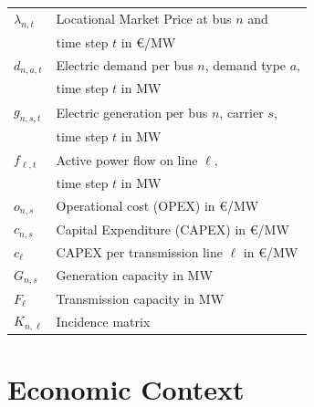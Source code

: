 \documentclass[11pt,twocolumn]{article}
\newcommand{\vpad}{\vspace{1mm}}
\newcommand{\generation}[1][n]{g_{#1,s,t}}
\newcommand{\capacityGeneration}{G_{n,s}}
\newcommand{\capacityFlow}{F_{\ell}}
\newcommand{\capexGeneration}{c_{n,s}}
\newcommand{\capexFlow}{c_{\ell}}
\newcommand{\opexGeneration}[1][n]{o_{#1,s}}
\newcommand{\demand}[1][n]{d_{#1,a,t}}
\newcommand{\incidence}[1][n]{K_{#1,\ell}}
\newcommand{\lmp}[1][n]{\lambda_{#1,t}}
\newcommand{\flow}{f_{\ell,t}}
\begin{document}
\begin{table}[h]
	\centering
	\begin{tabular}{ll}
        $\lmp$ & Locational Market Price at bus $n$ and  \\ & time step $t$ in \euro/MW \vpad \\
        $\demand$ & Electric demand per bus $n$, demand type $a$, \\ & time step $t$ in MW  \vpad \\
        $\generation$ & Electric generation per bus $n$, carrier $s$, \\ & time step $t$  in MW \vpad \\
        $\flow$ & Active power flow on line $\ell$, \\ & time step $t$ in MW   \vpad \\
        $\opexGeneration$ & Operational cost (OPEX) in \euro/MW \vpad \\
        $\capexGeneration$ & Capital Expenditure (CAPEX) in \euro/MW \vpad \\
        $\capexFlow$  & CAPEX per transmission line $\ell$ in \euro/MW  \vpad \\
        $\capacityGeneration$ & Generation capacity in MW \vpad \\
        $\capacityFlow$ & Transmission capacity in MW \vpad \\
        $\incidence$ & Incidence matrix \vpad 
	\end{tabular}
\end{table}

\section{Economic Context}
\end{document}
